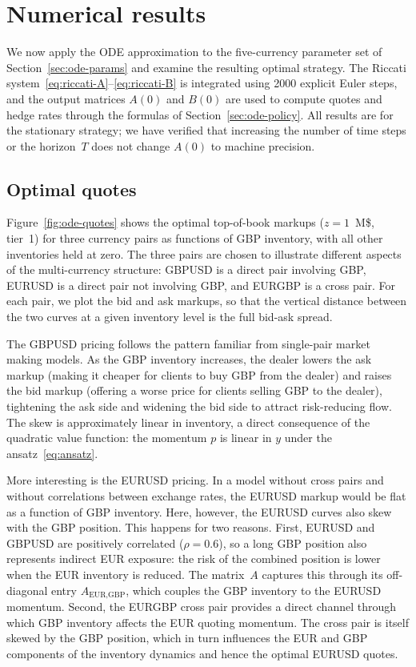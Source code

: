 \section{Numerical results}
\label{sec:ode-results}

We now apply the ODE approximation to the five-currency parameter set of Section~\ref{sec:ode-params} and examine the resulting optimal strategy. The Riccati system~\eqref{eq:riccati-A}--\eqref{eq:riccati-B} is integrated using 2000 explicit Euler steps, and the output matrices $A(0)$ and $B(0)$ are used to compute quotes and hedge rates through the formulas of Section~\ref{sec:ode-policy}. All results are for the stationary strategy; we have verified that increasing the number of time steps or the horizon~$T$ does not change $A(0)$ to machine precision.


\subsection{Optimal quotes}
\label{sec:ode-results-quotes}

Figure~\ref{fig:ode-quotes} shows the optimal top-of-book markups ($z = 1$~M\$, tier~1) for three currency pairs as functions of GBP inventory, with all other inventories held at zero. The three pairs are chosen to illustrate different aspects of the multi-currency structure: GBPUSD is a direct pair involving GBP, EURUSD is a direct pair not involving GBP, and EURGBP is a cross pair. For each pair, we plot the bid and ask markups, so that the vertical distance between the two curves at a given inventory level is the full bid-ask spread.

The GBPUSD pricing follows the pattern familiar from single-pair market making models. As the GBP inventory increases, the dealer lowers the ask markup (making it cheaper for clients to buy GBP from the dealer) and raises the bid markup (offering a worse price for clients selling GBP to the dealer), tightening the ask side and widening the bid side to attract risk-reducing flow. The skew is approximately linear in inventory, a direct consequence of the quadratic value function: the momentum $p$ is linear in $y$ under the ansatz~\eqref{eq:ansatz}.

More interesting is the EURUSD pricing. In a model without cross pairs and without correlations between exchange rates, the EURUSD markup would be flat as a function of GBP inventory. Here, however, the EURUSD curves also skew with the GBP position. This happens for two reasons. First, EURUSD and GBPUSD are positively correlated ($\rho = 0.6$), so a long GBP position also represents indirect EUR exposure: the risk of the combined position is lower when the EUR inventory is reduced. The matrix~$A$ captures this through its off-diagonal entry $A_{\text{EUR},\text{GBP}}$, which couples the GBP inventory to the EURUSD momentum. Second, the EURGBP cross pair provides a direct channel through which GBP inventory affects the EUR quoting momentum. The cross pair is itself skewed by the GBP position, which in turn influences the EUR and GBP components of the inventory dynamics and hence the optimal EURUSD quotes.

